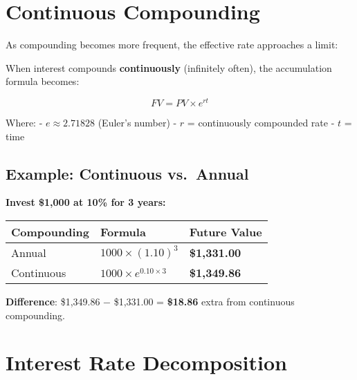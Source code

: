 \documentclass[
  letterpaper,
]{scrbook}
\begin{document}
\section{Continuous Compounding}\label{continuous-compounding}

As compounding becomes more frequent, the effective rate approaches a
limit:

\begin{tcolorbox}[enhanced jigsaw, toptitle=1mm, colbacktitle=quarto-callout-note-color!10!white, opacityback=0, leftrule=.75mm, breakable, colframe=quarto-callout-note-color-frame, toprule=.15mm, opacitybacktitle=0.6, coltitle=black, bottomrule=.15mm, colback=white, arc=.35mm, titlerule=0mm, rightrule=.15mm, left=2mm, title=\textcolor{quarto-callout-note-color}{\faInfo}\hspace{0.5em}{Definition: Continuous Compounding}, bottomtitle=1mm]

When interest compounds \textbf{continuously} (infinitely often), the
accumulation formula becomes:

\[
FV = PV \times e^{rt}
\]

Where: - \(e \approx 2.71828\) (Euler's number) - \(r\) = continuously
compounded rate - \(t\) = time

\end{tcolorbox}

\subsection{Example: Continuous
vs.~Annual}\label{example-continuous-vs.-annual}

\textbf{Invest \$1,000 at 10\% for 3 years:}

\begin{longtable}[]{@{}lll@{}}
\toprule\noalign{}
Compounding & Formula & Future Value \\
\midrule\noalign{}
\endhead
\bottomrule\noalign{}
\endlastfoot
Annual & \(1000 \times (1.10)^3\) & \textbf{\$1,331.00} \\
Continuous & \(1000 \times e^{0.10 \times 3}\) & \textbf{\$1,349.86} \\
\end{longtable}

\textbf{Difference}: \$1,349.86 − \$1,331.00 = \textbf{\$18.86} extra
from continuous compounding.

\section{Interest Rate Decomposition}\label{interest-rate-decomposition}
\end{document}
